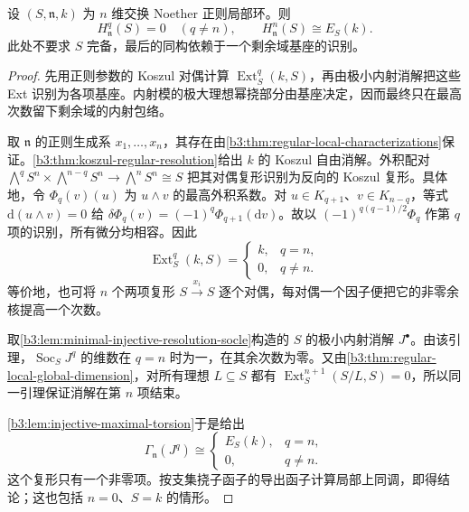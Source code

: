 \begin{proposition}\label{b3:prop:regular-local-top-cohomology}
	设 \((S,\mathfrak n,k)\) 为 \(n\) 维交换 Noether 正则局部环。则
	\[
		H^q_{\mathfrak n}(S)=0\quad(q\ne n), \qquad H^n_{\mathfrak n}(S)\cong E_S(k).
	\]
	此处不要求 \(S\) 完备，最后的同构依赖于一个剩余域基座的识别。
\end{proposition}
\begin{proof}
	先用正则参数的 Koszul 对偶计算 \(\operatorname{Ext}_S^q(k,S)\)，再由极小内射消解把这些 Ext 识别为各项基座。内射模的极大理想幂挠部分由基座决定，因而最终只在最高次数留下剩余域的内射包络。

	取 \(\mathfrak n\) 的正则生成系 \(x_1,\ldots,x_n\)，其存在由\cref{b3:thm:regular-local-characterizations}保证。\cref{b3:thm:koszul-regular-resolution}给出 \(k\) 的 Koszul 自由消解。外积配对 \(\bigwedge^qS^n\times\bigwedge^{n-q}S^n\rightarrow\bigwedge^nS^n\cong S\) 把其对偶复形识别为反向的 Koszul 复形。具体地，令 \(\Phi_q(v)(u)\) 为 \(u\wedge v\) 的最高外积系数。对 \(u\in K_{q+1}\)、\(v\in K_{n-q}\)，等式 \(\mathrm{d}(u\wedge v)=0\) 给 \(\delta\Phi_q(v)=(-1)^q\Phi_{q+1}(\mathrm{d}v)\)。故以 \((-1)^{q(q-1)/2}\Phi_q\) 作第 \(q\) 项的识别，所有微分均相容。因此
	\[
		\operatorname{Ext}_S^q(k,S)=
		\begin{cases}k,&q=n,\\0,&q\ne n.\end{cases}
	\]
	等价地，也可将 \(n\) 个两项复形 \(S\xrightarrow{x_i}S\) 逐个对偶，每对偶一个因子便把它的非零余核提高一个次数。

	取\cref{b3:lem:minimal-injective-resolution-socle}构造的 \(S\) 的极小内射消解 \(J^\bullet\)。由该引理，\(\operatorname{Soc}_S J^q\) 的维数在 \(q=n\) 时为一，在其余次数为零。又由\cref{b3:thm:regular-local-global-dimension}，对所有理想 \(L\subseteq S\) 都有 \(\operatorname{Ext}_S^{n+1}(S/L,S)=0\)，所以同一引理保证消解在第 \(n\) 项结束。

	\cref{b3:lem:injective-maximal-torsion}于是给出
	\[
		\Gamma_{\mathfrak n}(J^q)\cong
		\begin{cases}E_S(k),&q=n,\\0,&q\ne n.\end{cases}
	\]
	这个复形只有一个非零项。按支集挠子函子的导出函子计算局部上同调，即得结论；这也包括 \(n=0\)、\(S=k\) 的情形。
\end{proof}

